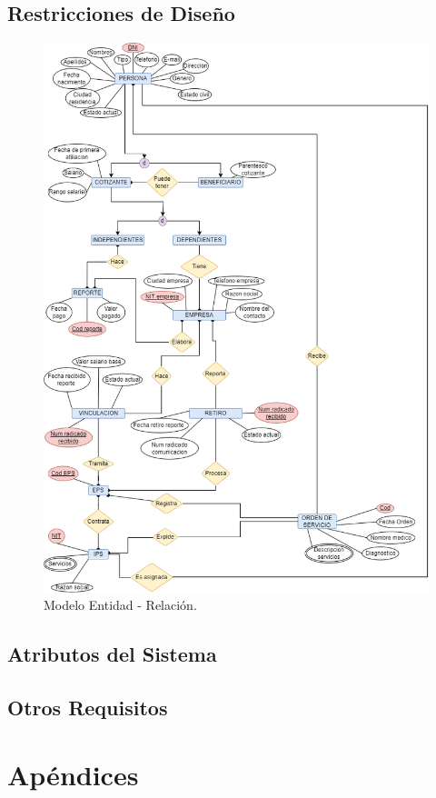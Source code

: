 \documentclass[12pt,a4paper]{article}
\begin{document}
\subsection{Restricciones de Diseño}
\begin{figure}[H]
\centering
{\includegraphics[width=1 \textwidth]{entity_relationship_model.png} \par}
\caption{Modelo Entidad - Relación.}
\end{figure}
\subsection{Atributos del Sistema}
\subsection{Otros Requisitos}
\section{Apéndices}
\end{document}
